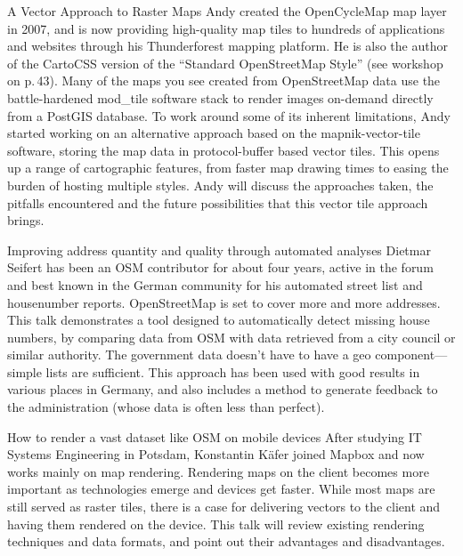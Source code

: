 %
{A Vector Approach to Raster Maps}%
{Andy created the OpenCycleMap map layer in 2007, and is now providing high-quality map tiles to hundreds of applications and websites through his Thunderforest mapping platform. He is also the author of the CartoCSS version of the ``Standard OpenStreetMap Style'' (see workshop on p.\,43).}%
{Many of the maps you see created from OpenStreetMap data use the battle-hardened mod\_tile software stack to render images on-demand directly from a PostGIS data\-base. To work around some of its inherent limitations, Andy started working on an alternative approach based on the mapnik-vector-tile software, storing the map data in protocol-buffer based vector tiles. This opens up a range of cartographic features, from faster map drawing times to easing the burden of hosting multiple styles. Andy will discuss the approaches taken, the pitfalls encountered and the future possibilities that this vector tile approach brings.}


%
{Improving address quantity and quality through automated analyses}%
{Dietmar Seifert has been an OSM contributor for about four years, active in the forum and best known in the German  community for his automated street list and housenumber reports.}%
{OpenStreetMap is set to cover more and more addresses. This talk demonstrates a tool designed to automatically detect missing house numbers, by comparing data from OSM with data retrieved from a city council or similar authority. The government data doesn't have to have a geo component---simple lists are sufficient. This approach has been used with good results in various places in Germany, and also includes a method to generate feedback to the administration (whose data is often less than perfect).}

%
{How to render a vast dataset like OSM on mobile devices}%
{After studying IT Systems Engineering in Potsdam, Konstantin Käfer joined Mapbox and now works mainly on map rendering.}%
{Rendering maps on the client becomes more important as technologies emerge and devices get faster. While most maps are still served as raster tiles, there is a case for delivering vectors to the client and having them rendered on the device. This talk will review existing rendering techniques and data formats, and point out their advantages and disadvantages.}

